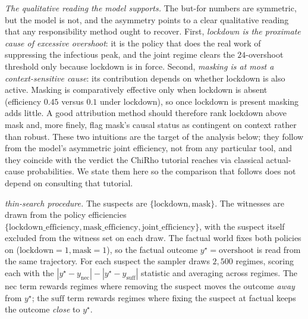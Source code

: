 \medskip\noindent\textit{The qualitative reading the model supports.}
The but-for numbers are symmetric, but the model is not, and the asymmetry
points to a clear qualitative reading that any responsibility method ought to
recover. First, \emph{lockdown is the proximate cause of excessive overshoot}:
it is the policy that does the real work of suppressing the infectious peak,
and the joint regime clears the $24$-overshoot threshold only because lockdown
is in force. Second, \emph{masking is at most a context-sensitive cause}: its
contribution depends on whether lockdown is also active. Masking is
comparatively effective only when lockdown is absent (efficiency $0.45$ versus
$0.1$ under lockdown), so once lockdown is present masking adds little. A good
attribution method should therefore rank lockdown above mask and, more finely,
flag mask's causal status as contingent on context rather than robust. These
two intuitions are the target of the analysis below; they follow from the
model's asymmetric joint efficiency, not from any particular tool, and they
coincide with the verdict the ChiRho tutorial reaches via classical
actual-cause probabilities. We state them here so the comparison that follows
does not depend on consulting that tutorial.

\medskip\noindent\textit{\ourapproach thin-search procedure.}
The suspects are $\{\mathrm{lockdown},\mathrm{mask}\}$. The witnesses are
drawn from the policy efficiencies
$\{\mathrm{lockdown\_efficiency}, \mathrm{mask\_efficiency},
\mathrm{joint\_efficiency}\}$, with the suspect itself excluded from the
witness set on each draw. The factual world fixes both policies on
($\mathrm{lockdown}=1, \mathrm{mask}=1$), so the factual outcome
$y^\star=\mathrm{overshoot}$ is read from the same trajectory. For each
suspect the sampler draws $2{,}500$ regimes, scoring each with the
$|y^\star-y_{\mathrm{nec}}| - |y^\star-y_{\mathrm{suff}}|$ statistic and
averaging across regimes. The $\mathrm{nec}$ term rewards regimes where
removing the suspect moves the outcome \emph{away} from $y^\star$; the
$\mathrm{suff}$ term rewards regimes where fixing the suspect at factual
keeps the outcome \emph{close} to $y^\star$.

